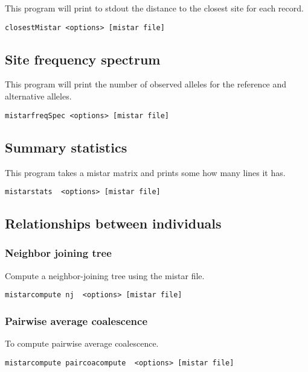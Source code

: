 \documentclass[a4paper]{article}
\begin{document}
This program will print to stdout the distance to the closest site for each record.

\begin{verbatim}
closestMistar <options> [mistar file]
\end{verbatim}

\subsection{Site frequency spectrum}

This program will print the number of observed alleles for the reference and alternative alleles.

\begin{verbatim}
mistarfreqSpec <options> [mistar file]
\end{verbatim}

\subsection{Summary statistics}

This program takes a mistar matrix and prints some how many lines it has.
\begin{verbatim}
mistarstats  <options> [mistar file]
\end{verbatim}


\subsection{Relationships between individuals}


\subsubsection{Neighbor joining tree}

Compute a neighbor-joining tree using the mistar file.

\begin{verbatim}
mistarcompute nj  <options> [mistar file]
\end{verbatim}

\subsubsection{Pairwise average coalescence}

To compute pairwise average coalescence.
\begin{verbatim}
mistarcompute paircoacompute  <options> [mistar file]
\end{verbatim}
\end{document}
